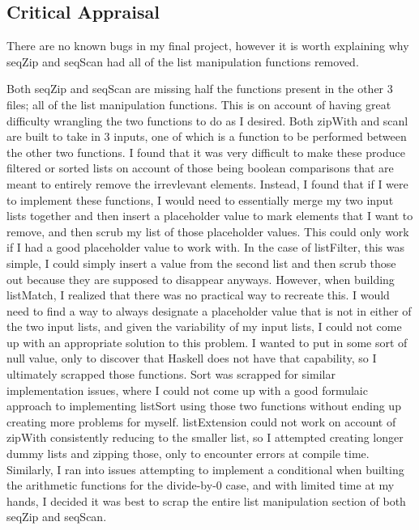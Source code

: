 \documentclass{article}
\theoremstyle{theorem}
\theoremstyle{definition}
\theoremstyle{remark}
\begin{document}
\subsection{Critical Appraisal}
There are no known bugs in my final project, however it is worth explaining why seqZip and seqScan had all of the list manipulation functions removed.

\medskip\noindent
Both seqZip and seqScan are missing half the functions present in the other 3 files; all of the list manipulation functions. This is on account of having great difficulty wrangling the two functions to do as I desired. Both zipWith and scanl are built to take in 3 inputs, one of which is a function to be performed between the other two functions. I found that it was very difficult to make these produce filtered or sorted lists on account of those being boolean comparisons that are meant to entirely remove the irrevlevant elements. Instead, I found that if I were to implement these functions, I would need to essentially merge my two input lists together and then insert a placeholder value to mark elements that I want to remove, and then scrub my list of those placeholder values. This could only work if I had a good placeholder value to work with. In the case of listFilter, this was simple, I could simply insert a value from the second list and then scrub those out because they are supposed to disappear anyways. However, when building listMatch, I realized that there was no practical way to recreate this. I would need to find a way to always designate a placeholder value that is not in either of the two input lists, and given the variability of my input lists, I could not come up with an appropriate solution to this problem. I wanted to put in some sort of null value, only to discover that Haskell does not have that capability, so I ultimately scrapped those functions. Sort was scrapped for similar implementation issues, where I could not come up with a good formulaic approach to implementing listSort using those two functions without ending up creating more problems for myself. listExtension could not work on account of zipWith consistently reducing to the smaller list, so I attempted creating longer dummy lists and zipping those, only to encounter errors at compile time. Similarly, I ran into issues attempting to implement a conditional when builting the arithmetic functions for the divide-by-0 case, and with limited time at my hands, I decided it was best to scrap the entire list manipulation section of both seqZip and seqScan.
\end{document}
